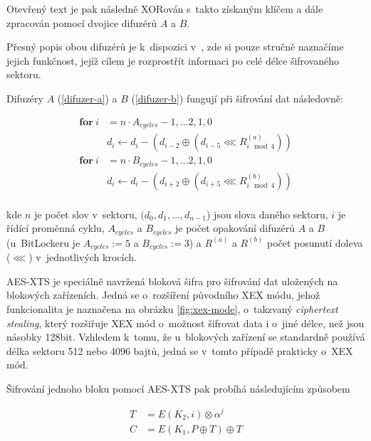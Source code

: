 Otevřený text je pak následně XORován s~takto získaným klíčem a dále zpracován pomocí dvojice difuzérů $A$ a $B$.

Přesný popis obou difuzérů je k~dispozici v~\cite{Ferguson2006}, zde si pouze stručně naznačíme jejich funkčnost, jejíž cílem je rozprostřít informaci po celé délce šifrovaného sektoru.

Difuzéry $A$ (\ref{difuzer-a}) a $B$ (\ref{difuzer-b}) fungují při šifrování dat následovně:

\begin{align}
\mathbf{for}\ i &= n \cdot A_{cycles} - 1,  \dots 2, 1, 0 \nonumber \\
	&d_i \leftarrow d_i - (d_{i-2} \oplus (d_{i-5} \lll R^{(a)}_{i \mod 4})) \label{difuzer-a} \\
\mathbf{for}\ i &= n \cdot B_{cycles} - 1,  \dots 2, 1, 0 \nonumber \\
	&d_i \leftarrow d_i - (d_{i+2} \oplus (d_{i+5} \lll R^{(b)}_{i \mod 4})) \label{difuzer-b} \\
\nonumber
\end{align}

kde $n$ je počet slov v~sektoru, $(d_0, d_1,\dots,d_{n-1}$) jsou slova daného sektoru, $i$ je řídící proměnná cyklu, $A_{cycles}$ a $B_{cycles}$ je počet opakování difuzérů $A$ a $B$ (u~BitLockeru je $A_{cycles} := 5$ a $B_{cycles} := 3$) a $R^{(a)}$ a $R^{(b)}$ počet posunutí doleva ($\lll$) v~jednotlivých krocích.\cite{Ferguson2006}


\label{sec:aes-xts}

AES-XTS je speciálně navržená bloková šifra pro šifrování dat uložených na blokových zařízeních. Jedná se o~rozšíření původního XEX módu, jehož funkcionalita je naznačena na obrázku \ref{fig:xex-mode}, o~takzvaný \emph{ciphertext stealing}, který rozšiřuje XEX mód o~možnost šifrovat data i o~jiné délce, než jsou násobky 128bit.\cite{Dworkin2010} Vzhledem k~tomu, že u~blokových zařízení se standardně používá délka sektoru 512 nebo 4096 bajtů, jedná se v~tomto případě prakticky o~XEX mód.


Šifrování jednoho bloku pomocí AES-XTS pak probíhá následujícím způsobem

\begin{align}
T &= E (K_2 , i) \otimes \alpha^j \\
C &= E (K_1 , P \oplus T) \oplus T \\ \nonumber
\end{align}

